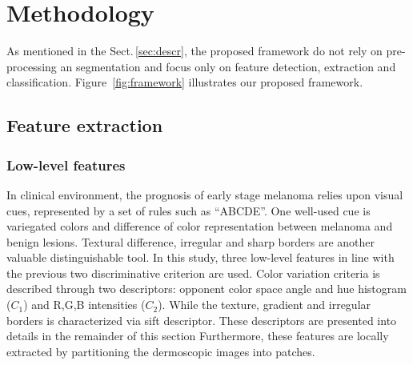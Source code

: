 \section{Methodology}
\label{sec:method}
\graphicspath{ {./content/method/figures/} }
As mentioned in the Sect.\,\ref{sec:descr}, the proposed framework do not rely on pre-processing an segmentation and focus only on feature detection, extraction and classification.
Figure~\ref{fig:framework} illustrates our proposed framework.


\subsection{Feature extraction}

\subsubsection{Low-level features}
In clinical environment, the prognosis of early stage melanoma relies upon visual cues, represented by a set of rules such as ``ABCDE''.
One well-used cue is variegated colors and difference of color representation between melanoma and benign lesions.
Textural difference, irregular and sharp borders are another valuable distinguishable tool. 
In this study, three low-level features in line with the previous two discriminative criterion are used.
Color variation criteria is described through two descriptors: opponent color space angle and hue histogram ($C_{1}$) and R,G,B intensities ($C_{2}$).
While the texture, gradient and irregular borders is characterized via \ac{sift} descriptor. 
These descriptors are presented into details in the remainder of this section
Furthermore, these features are locally extracted by partitioning the dermoscopic images into patches.


